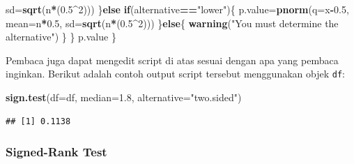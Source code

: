 \documentclass[]{book}
\newenvironment{Shaded}{\begin{snugshade}}{\end{snugshade}}
\newcommand{\KeywordTok}[1]{\textcolor[rgb]{0.13,0.29,0.53}{\textbf{#1}}}
\newcommand{\DataTypeTok}[1]{\textcolor[rgb]{0.13,0.29,0.53}{#1}}
\newcommand{\DecValTok}[1]{\textcolor[rgb]{0.00,0.00,0.81}{#1}}
\newcommand{\FloatTok}[1]{\textcolor[rgb]{0.00,0.00,0.81}{#1}}
\newcommand{\StringTok}[1]{\textcolor[rgb]{0.31,0.60,0.02}{#1}}
\newcommand{\ControlFlowTok}[1]{\textcolor[rgb]{0.13,0.29,0.53}{\textbf{#1}}}
\newcommand{\OperatorTok}[1]{\textcolor[rgb]{0.81,0.36,0.00}{\textbf{#1}}}
\newcommand{\NormalTok}[1]{#1}
\begin{document}
\begin{Shaded}
\begin{Highlighting}[]
                      \DataTypeTok{sd=}\KeywordTok{sqrt}\NormalTok{(n}\OperatorTok{*}\NormalTok{(}\FloatTok{0.5}\OperatorTok{^}\DecValTok{2}\NormalTok{)))}
\NormalTok{    \}}\ControlFlowTok{else} \ControlFlowTok{if}\NormalTok{(alternative}\OperatorTok{==}\StringTok{"lower"}\NormalTok{)\{}
\NormalTok{      p.value=}\KeywordTok{pnorm}\NormalTok{(}\DataTypeTok{q=}\NormalTok{x}\OperatorTok{-}\FloatTok{0.5}\NormalTok{, }\DataTypeTok{mean=}\NormalTok{n}\OperatorTok{*}\FloatTok{0.5}\NormalTok{, }
                      \DataTypeTok{sd=}\KeywordTok{sqrt}\NormalTok{(n}\OperatorTok{*}\NormalTok{(}\FloatTok{0.5}\OperatorTok{^}\DecValTok{2}\NormalTok{)))}
\NormalTok{    \}}\ControlFlowTok{else}\NormalTok{\{}
    \KeywordTok{warning}\NormalTok{(}\StringTok{"You must determine the alternative"}\NormalTok{)}
\NormalTok{    \}}
\NormalTok{  \}}
\NormalTok{  p.value}
\NormalTok{\}}
\end{Highlighting}
\end{Shaded}

Pembaca juga dapat mengedit script di atas sesuai dengan apa yang
pembaca inginkan. Berikut adalah contoh output script tersebut
menggunakan objek \texttt{df}:

\begin{Shaded}
\begin{Highlighting}[]
\KeywordTok{sign.test}\NormalTok{(}\DataTypeTok{df=}\NormalTok{df, }\DataTypeTok{median=}\FloatTok{1.8}\NormalTok{, }\DataTypeTok{alternative=}\StringTok{"two.sided"}\NormalTok{)}
\end{Highlighting}
\end{Shaded}

\begin{verbatim}
## [1] 0.1138
\end{verbatim}

\subsubsection{Signed-Rank Test}\label{signed-rank-test}
\end{document}
